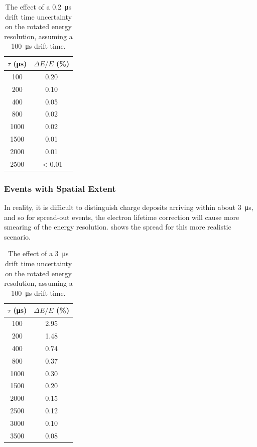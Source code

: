 \documentclass[herrin-thesis.tex]{subfiles}
\begin{document}
\begin{table}[htdp]
\centering
\begin{tabular}{c|c}
	\(\tau\) (\si{\micro\second})	&	\(\Delta E / E\) (\%) 	\\ \hline
	100					&	0.20				\\
	200					&	0.10				\\
	400					&	0.05				\\
	800					&	0.02				\\
	1000					&	0.02				\\
	1500					&	0.01				\\
	2000					&	0.01				\\
	2500					&	\(<\)0.01			
\end{tabular}
\caption[Drift time uncertainty effect on resolution]{The effect of a \SI{0.2}{\micro\second} drift time uncertainty on the rotated energy resolution, assuming a \SI{100}{\micro\second} drift time.}
\label{tab:res_dt_ideal}
\end{table}

\subsubsection{Events with Spatial Extent}
In reality, it is difficult to distinguish charge deposits arriving within about \SI{3}{\micro\second}, and so for spread-out events, the electron lifetime correction will cause more smearing of the energy resolution.  shows the spread for this more realistic scenario.

\begin{table}[htdp]
\centering
\begin{tabular}{c|c}
	\(\tau\) (\si{\micro\second})	&	\(\Delta E / E\) (\%) 	\\ \hline
	100					&	2.95				\\
	200					&	1.48				\\
	400					&	0.74				\\
	800					&	0.37				\\
	1000					&	0.30				\\
	1500					&	0.20				\\
	2000					&	0.15				\\
	2500					&	0.12				\\
	3000					&	0.10				\\
	3500					&	0.08
\end{tabular}
\caption[Drift time uncertainty effect on resolution]{The effect of a \SI{3}{\micro\second} drift time uncertainty on the rotated energy resolution, assuming a \SI{100}{\micro\second} drift time.}
\label{tab:res_dt}
\end{table}
\end{document}
